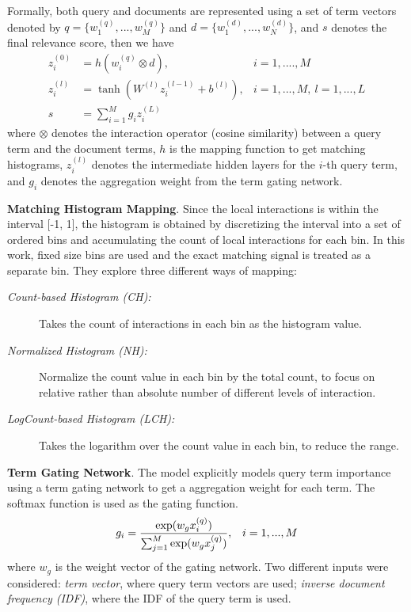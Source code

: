 Formally, both query and documents are represented using a set of term vectors denoted by $q=\{w^{(q)}_1,...,w^{(q)}_M\}$ and $d=\{w^{(d)}_1,...,w^{(d)}_N\}$, and $s$ denotes the final relevance score, then we have
\begin{align*}
    z^{(0)}_i &= h(w^{(q)}_i \otimes d), & i=1,....,M \\
    z^{(l)}_i &= \tanh(W^{(l)}z^{(l-1)}_i + b^{(l)}), & i=1,...,M,\ l=1,...,L \\
    s &= \sum_{i=1}^{M} g_i z^{(L)}_i &
\end{align*}
where $\otimes$ denotes the interaction operator (cosine similarity) between a query term and the document terms, $h$ is the mapping function to get matching histograms, $z^{(l)}_i$ denotes the intermediate hidden layers for the $i$-th query term, and $g_i$ denotes the aggregation weight from the term gating network.

\textbf{Matching Histogram Mapping}. Since the local interactions is within the interval [-1, 1], the histogram is obtained by discretizing the interval into a set of ordered bins and accumulating the count of local interactions for each bin. In this work, fixed size bins are used and the exact matching signal is treated as a separate bin. They explore three different ways of mapping:
\begin{description}
    \item[\normalfont\itshape Count-based Histogram (CH):] Takes the count of interactions in each bin as the histogram value.
    \item[\normalfont\itshape Normalized Histogram (NH):] Normalize the count value in each bin by the total count, to focus on relative rather than absolute number of different levels of interaction.
    \item[\normalfont\itshape LogCount-based Histogram (LCH):] Takes the logarithm over the count value in each bin, to reduce the range.
\end{description}


\textbf{Term Gating Network}. The model explicitly models query term importance using a term gating network to get a aggregation weight for each term. The softmax function is used as the gating function.
\begin{align*}
    \centering
    g_i &= \frac{\exp (w_g x^{(q)}_i)}{\sum_{j=1}^{M} \exp (w_g x^{(q)}_j)}, & i=1,...,M
\end{align*}
where $w_g$ is the weight vector of the gating network. Two different inputs were considered: \textit{term vector}, where query term vectors are used; \textit{inverse document frequency (IDF)}, where the IDF of the query term is used.

